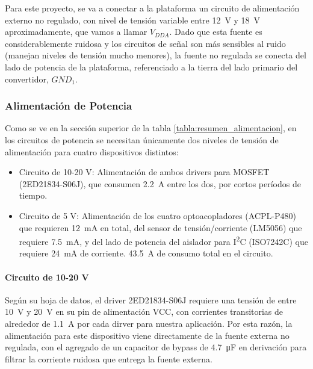 Para este proyecto, se va a conectar a la plataforma un circuito de alimentación externo no regulado, con nivel de tensión variable entre \SI[]{12}[]{\volt} y \SI[]{18}[]{\volt} aproximadamente, que vamos a llamar $V_{DDA}$. Dado que esta fuente es considerablemente ruidosa y los circuitos de señal son más sensibles al ruido (manejan niveles de tensión mucho menores), la fuente no regulada se conecta del lado de potencia de la plataforma, referenciado a la tierra del lado primario del convertidor, $GND_1$.\\

\subsubsection{Alimentación de Potencia}

Como se ve en la sección superior de la tabla \ref{tabla:resumen_alimentacion}, en los circuitos de potencia se necesitan únicamente dos niveles de tensión de alimentación para cuatro dispositivos distintos:\\

\begin{itemize}
    \item {\SemiBold Circuito de 10-20 V:} Alimentación de ambos drivers para MOSFET (2ED21834-S06J), que consumen \SI[]{2.2}[]{\ampere} entre los dos, por cortos períodos de tiempo. 
    \item {\SemiBold Circuito de 5 V:} Alimentación de los cuatro optoacopladores (ACPL-P480) que requieren \SI[]{12}[]{\milli\ampere} en total, del sensor de tensión/corriente (LM5056) que requiere \SI[]{7.5}[]{\milli\ampere}, y del lado de potencia del aislador para I\textsuperscript{2}C (ISO7242C) que requiere \SI[]{24}[]{\milli\ampere} de corriente. \SI[]{43.5}[]{\ampere} de consumo total en el circuito.\\
\end{itemize}

\paragraph{Circuito de 10-20 V}

Según su hoja de datos, el driver 2ED21834-S06J requiere una tensión de entre \SI[]{10}[]{\volt} y \SI[]{20}[]{\volt} en su pin de alimentación VCC, con corrientes transitorias de alrededor de \SI[]{1.1}[]{\ampere} por cada dirver para nuestra aplicación. Por esta razón, la {\Medium alimentación para este dispositivo viene directamente de la fuente externa no regulada}, con el agregado de un capacitor de bypass de \SI[]{4.7}[]{\micro\farad} en derivación para filtrar la corriente ruidosa que entrega la fuente externa.\\

